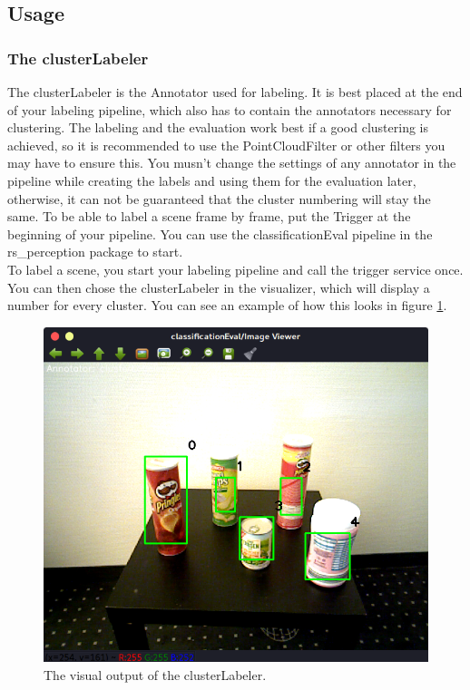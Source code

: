\documentclass[main.tex]{subfiles}
\begin{document}
\subsection{Usage}

\subsubsection{The clusterLabeler}
The clusterLabeler is the Annotator used for labeling. It is best placed at the end of your labeling pipeline, which also has to contain the annotators necessary for clustering. The labeling and the evaluation work best if a good clustering is achieved, so it is recommended to use the PointCloudFilter or other filters you may have to ensure this. You musn't change the settings of any annotator in the pipeline while creating the labels and using them for the evaluation later, otherwise, it can not be guaranteed that the cluster numbering will stay the same. To be able to label a scene frame by frame, put the Trigger at the beginning of your pipeline. You can use the classificationEval pipeline in the rs\_perception package to start.\\

To label a scene, you start your labeling pipeline and call the trigger service once. You can then chose the clusterLabeler in the visualizer, which will display a number for every cluster. You can see an example of how this looks in figure \ref{fig:clusterLabeler visualization}.
\begin{figure}
  \includegraphics[width=\linewidth]{pictures/perception/cluster_numbering.png}
  \caption{The visual output of the clusterLabeler.}
  \label{fig:clusterLabeler visualization}
\end{figure}
\end{document}
